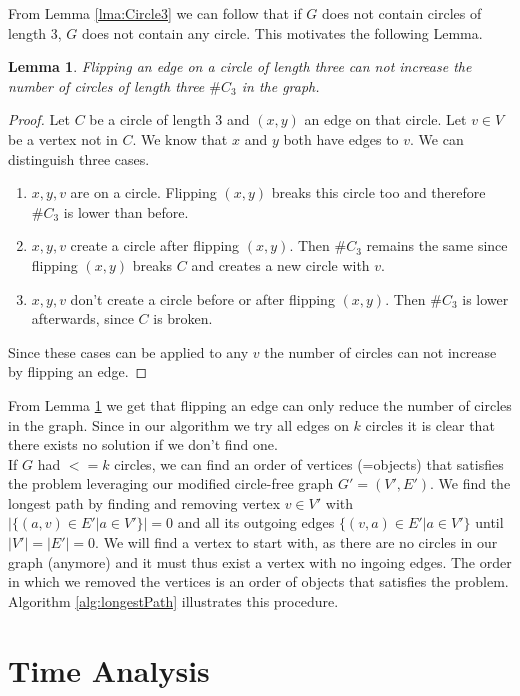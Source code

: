 \documentclass{article}
\newtheorem{lemma}[theorem]{Lemma}
\begin{document}
From Lemma \ref{lma:Circle3} we can follow that if $G$ does not contain circles of length 3, $G$ does not contain any circle. This motivates the following Lemma.
\begin{lemma}\label{lma:Flip}
    Flipping an edge on a circle of length three can not increase the number of circles of length three $\#C_3$ in the graph.
\end{lemma}
\begin{proof}
    Let $C$ be a circle of length 3 and $(x,y)$ an edge on that circle. Let $v \in V$ be a vertex not in $C$. We know that $x$ and $y$ both have edges to $v$. We can distinguish three cases.
    \begin{enumerate}[label=\textbf{Case \arabic*:}, left=0pt, itemindent=*, labelindent=1em]
        \item $x,y,v$ are on a circle. Flipping $(x,y)$ breaks this circle too and therefore $\#C_3$ is lower than before.
        \item $x,y,v$ create a circle after flipping $(x,y)$. Then $\#C_3$ remains the same since flipping $(x,y)$ breaks $C$ and creates a new circle with $v$.
        \item $x,y,v$ don't create a circle before or after flipping $(x,y)$. Then $\#C_3$ is lower afterwards, since $C$ is broken.
    \end{enumerate}
    Since these cases can be applied to any $v$ the number of circles can not increase by flipping an edge.
\end{proof}
From Lemma \ref{lma:Flip} we get that flipping an edge can only reduce the number of circles in the graph. Since in our algorithm we try all edges on $k$ circles it is clear that there exists no solution if we don't find one. 
\\
If $G$ had $<=k$ circles, we can find an order of vertices (=objects) that satisfies the problem leveraging our modified circle-free graph $G'=(V',E')$. We find the longest path by finding and removing vertex $v\in V'$ with $|\{(a,v)\in E'| a\in V'\}|=0$ and all its outgoing edges $\{(v,a)\in E'|a\in V'\}$ until $|V'|=|E'|=0$. We will find a vertex to start with, as there are no circles in our graph (anymore) and it must thus exist a vertex with no ingoing edges. The order in which we removed the vertices is an order of objects that satisfies the problem. Algorithm \ref{alg:longestPath} illustrates this procedure.

\section{Time Analysis}
\end{document}
